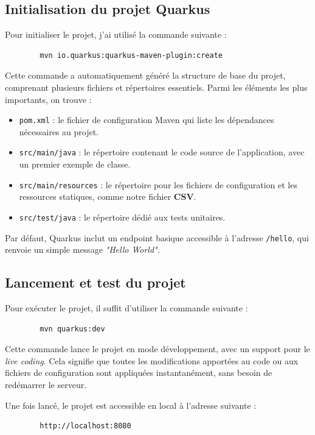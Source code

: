 \documentclass{article}
\begin{document}
	\subsection{Initialisation du projet Quarkus}
	
	Pour initialiser le projet, j’ai utilisé la commande suivante :
	\begin{verbatim}
		mvn io.quarkus:quarkus-maven-plugin:create
	\end{verbatim}
	
	Cette commande a automatiquement généré la structure de base du projet, comprenant plusieurs fichiers et répertoires essentiels. Parmi les éléments les plus importants, on trouve :
	\begin{itemize}
		\item \texttt{pom.xml} : le fichier de configuration Maven qui liste les dépendances nécessaires au projet.
		\item \texttt{src/main/java} : le répertoire contenant le code source de l’application, avec un premier exemple de classe.
		\item \texttt{src/main/resources} : le répertoire pour les fichiers de configuration et les ressources statiques, comme notre fichier \textbf{CSV}.
		\item \texttt{src/test/java} : le répertoire dédié aux tests unitaires.
	\end{itemize}
	
	Par défaut, Quarkus inclut un endpoint basique accessible à l’adresse \texttt{/hello}, qui renvoie un simple message \textit{"Hello World"}.
	
	\subsection{Lancement et test du projet}
	
	Pour exécuter le projet, il suffit d’utiliser la commande suivante :
	\begin{verbatim}
		mvn quarkus:dev
	\end{verbatim}
	
	Cette commande lance le projet en mode développement, avec un support pour le \textit{live coding}. Cela signifie que toutes les modifications apportées au code ou aux fichiers de configuration sont appliquées instantanément, sans besoin de redémarrer le serveur.
	
	Une fois lancé, le projet est accessible en local à l’adresse suivante :
	\begin{verbatim}
		http://localhost:8080
	\end{verbatim}
	
\end{document}
